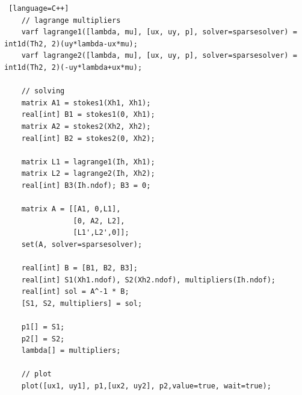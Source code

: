 \documentclass{article}
\begin{document}
\begin{lstlisting} [language=C++]
	// lagrange multipliers
	varf lagrange1([lambda, mu], [ux, uy, p], solver=sparsesolver) = int1d(Th2, 2)(uy*lambda-ux*mu);
	varf lagrange2([lambda, mu], [ux, uy, p], solver=sparsesolver) = int1d(Th2, 2)(-uy*lambda+ux*mu);

	// solving
	matrix A1 = stokes1(Xh1, Xh1);
	real[int] B1 = stokes1(0, Xh1);
	matrix A2 = stokes2(Xh2, Xh2);
	real[int] B2 = stokes2(0, Xh2);

	matrix L1 = lagrange1(Ih, Xh1);
	matrix L2 = lagrange2(Ih, Xh2);
	real[int] B3(Ih.ndof); B3 = 0;

	matrix A = [[A1, 0,L1],
		    	[0, A2, L2], 
		    	[L1',L2',0]];
	set(A, solver=sparsesolver);

	real[int] B = [B1, B2, B3];
	real[int] S1(Xh1.ndof), S2(Xh2.ndof), multipliers(Ih.ndof);
	real[int] sol = A^-1 * B;
	[S1, S2, multipliers] = sol;

	p1[] = S1;
	p2[] = S2;
	lambda[] = multipliers;

	// plot
	plot([ux1, uy1], p1,[ux2, uy2], p2,value=true, wait=true);
\end{lstlisting}
\end{document}
